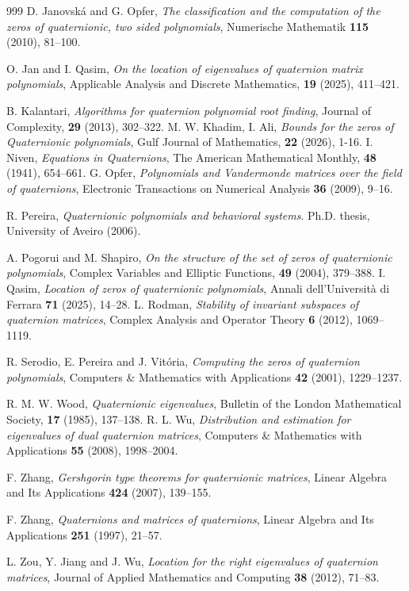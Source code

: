 \documentclass [12pt]{article}
\begin{document}
\begin{thebibliography}{999}
 D. Janovsk\'{a} and G. Opfer, \textit{The classification and the computation of the zeros of quaternionic, two sided polynomials}, Numerische Mathematik \textbf{115} (2010), 81--100.

 O. Jan and I. Qasim, \textit{On the location of eigenvalues of quaternion matrix polynomials}, Applicable Analysis and Discrete Mathematics, \textbf{19} (2025), 411--421.

 B. Kalantari, \textit{Algorithms for quaternion polynomial root finding}, Journal of Complexity, \textbf{29} (2013), 302--322.
 M. W. Khadim, I. Ali, \textit{Bounds for the zeros of Quaternionic polynomials}, Gulf Journal of Mathematics, \textbf{22} (2026), 1-16. 
 I. Niven, \textit{Equations in Quaternions}, The American Mathematical Monthly, \textbf{48} (1941), 654--661.
 G. Opfer, \textit{Polynomials and Vandermonde matrices over the field of quaternions}, Electronic Transactions on Numerical Analysis \textbf{36} (2009), 9--16.

R. Pereira, \textit{ Quaternionic polynomials and behavioral systems}. Ph.D. thesis, University of Aveiro (2006).

 A. Pogorui and M. Shapiro, \textit{ On the structure of the set of zeros of quaternionic polynomials}, Complex Variables and Elliptic Functions, \textbf{49} (2004), 379--388.
 I. Qasim, \textit{ Location of zeros of quaternionic polynomials}, Annali dell'Università di Ferrara \textbf{71} (2025), 14--28.
L. Rodman, \textit{Stability of invariant subspaces of quaternion matrices}, Complex Analysis and Operator Theory \textbf{6} (2012), 1069--1119.

R. Serodio, E. Pereira and J. Vitória, \textit{Computing the zeros of quaternion polynomials}, Computers \& Mathematics with Applications \textbf{42} (2001), 1229--1237.



 R. M. W. Wood, \textit{Quaternionic eigenvalues}, Bulletin of the London Mathematical Society, \textbf{17} (1985), 137--138.
  R. L. Wu, \textit{Distribution and estimation for eigenvalues of dual quaternion matrices}, Computers \& Mathematics with Applications \textbf{55} (2008), 1998--2004.


F. Zhang, \textit{Gershgorin type theorems for quaternionic matrices}, Linear Algebra and Its Applications \textbf{424} (2007), 139--155.


F. Zhang, \textit{Quaternions and matrices of quaternions}, Linear Algebra and Its Applications \textbf{251} (1997), 21--57.


L. Zou, Y. Jiang and J. Wu, \textit{Location for the right eigenvalues of quaternion matrices}, Journal of Applied Mathematics and Computing \textbf{38} (2012), 71--83.




\end{thebibliography}










 
\end{document}
